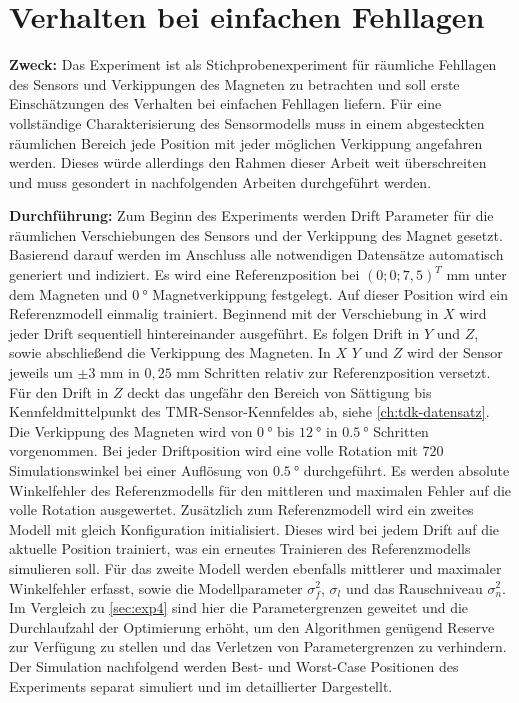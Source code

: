 %

\section{Verhalten bei einfachen Fehllagen}\label{sec:exp5}

\textbf{Zweck:} Das Experiment ist als Stichprobenexperiment für räumliche Fehllagen des Sensors und Verkippungen des Magneten zu betrachten und soll erste Einschätzungen des Verhalten bei einfachen Fehllagen liefern. Für eine vollständige Charakterisierung des Sensormodells muss in einem abgesteckten räumlichen Bereich jede Position mit jeder möglichen Verkippung angefahren werden. Dieses würde allerdings den Rahmen dieser Arbeit weit überschreiten und muss gesondert in nachfolgenden Arbeiten durchgeführt werden.

\textbf{Durchführung:} Zum Beginn des Experiments werden Drift Parameter für die räumlichen Verschiebungen des Sensors und der Verkippung des Magnet gesetzt. Basierend darauf werden im Anschluss alle notwendigen Datensätze automatisch generiert und indiziert. Es wird eine Referenzposition bei $(0;0;7,5)^T$ mm unter dem Magneten und $\SI{0}{\degree}$ Magnetverkippung festgelegt. Auf dieser Position wird ein Referenzmodell einmalig trainiert. Beginnend mit der Verschiebung in $X$ wird jeder Drift sequentiell hintereinander ausgeführt. Es folgen Drift in $Y$ und $Z$, sowie abschließend die Verkippung des Magneten. In $X$ $Y$ und $Z$ wird der Sensor jeweils um $\pm 3$ mm in $0,25$ mm Schritten relativ zur Referenzposition versetzt. Für den Drift in $Z$ deckt das ungefähr den Bereich von Sättigung bis Kennfeldmittelpunkt des TMR-Sensor-Kennfeldes ab, siehe \autoref{ch:tdk-datensatz}. Die Verkippung des Magneten wird von $\SI{0}{\degree}$ bis $\SI{12}{\degree}$ in $\SI{0,5}{\degree}$ Schritten vorgenommen. Bei jeder Driftposition wird eine volle Rotation mit $720$ Simulationswinkel bei einer Auflösung von $\SI{0,5}{\degree}$ durchgeführt. Es werden absolute Winkelfehler des Referenzmodells für den mittleren und maximalen Fehler auf die volle Rotation ausgewertet. Zusätzlich zum Referenzmodell wird ein zweites Modell mit gleich Konfiguration initialisiert. Dieses wird bei jedem Drift auf die aktuelle Position trainiert, was ein erneutes Trainieren des Referenzmodells simulieren soll. Für das zweite Modell werden ebenfalls mittlerer und maximaler Winkelfehler erfasst, sowie die Modellparameter $\sigma_f^2$, $\sigma_l$ und das Rauschniveau $\sigma_n^2$. Im Vergleich zu \autoref{sec:exp4} sind hier die Parametergrenzen geweitet und die Durchlaufzahl der Optimierung erhöht, um den Algorithmen genügend Reserve zur Verfügung zu stellen und das Verletzen von Parametergrenzen zu verhindern. Der Simulation nachfolgend werden Best- und Worst-Case Positionen des Experiments separat simuliert und im detaillierter Dargestellt.


